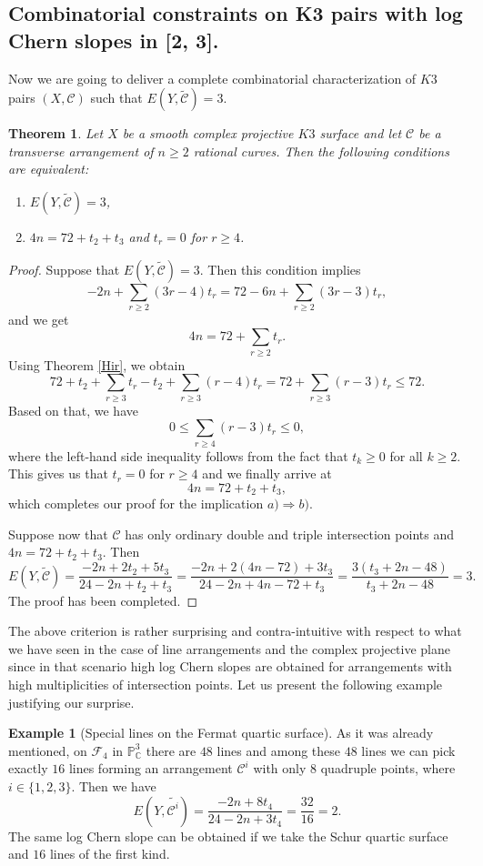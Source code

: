 \documentclass{article}
\theoremstyle{plain}
\newtheorem{theorem}[thm]{Theorem}
\theoremstyle{definition}
\newtheorem{example}[thm]{Example}
\numberwithin{equation}{section}
\begin{document}
\subsection{Combinatorial constraints on K3 pairs with log Chern slopes in [2, 3].}\label{sec:comb_constr_K3}
Now we are going to deliver a complete combinatorial characterization of $K3$ pairs $(X,\mathcal{C})$ such that $E(Y,\widetilde{\mathcal{C}}) = 3$.
\begin{theorem}
\label{bl}
Let $X$ be a smooth complex projective $K3$ surface and let $\mathcal{C}$ be a transverse arrangement of $n\geq 2$ rational curves. Then the following conditions are equivalent:
\begin{enumerate}
\item[a)] $E(Y,\widetilde{\mathcal{C}}) = 3$, 
\item[b)] $4n = 72 + t_{2}+t_{3}$ and $t_{r}=0$ for $r\geq 4$.
\end{enumerate}
\end{theorem}
\begin{proof}
Suppose that $E(Y,\widetilde{\mathcal{C}}) = 3$. Then this condition implies
\[-2n + \sum_{r\geq 2}(3r-4)t_{r} = 72 - 6n + \sum_{r\geq 2}(3r-3)t_{r},\]
and we get
\[4n = 72 + \sum_{r\geq 2}t_{r}.\]
Using Theorem \ref{Hir}, we obtain
\[72 + t_{2} + \sum_{r\geq 3} t_{r} - t_{2} + \sum_{r\geq 3}(r-4)t_{r} = 72 + \sum_{r\geq 3}(r-3)t_{r} \leq 72.\]
Based on that, we have 
\[0 \leq \sum_{r\geq 4}(r-3)t_{r} \leq 0,\]
where the left-hand side inequality follows from the fact that $t_{k}\geq 0$ for all $k\geq 2$. This gives us that $t_{r} = 0$ for $r\geq 4$ and we finally arrive at
\[4n = 72 +t_{2}+t_{3},\]
which completes our proof for the implication $a) \Rightarrow b)$.

Suppose now that $\mathcal{C}$ has only ordinary double and triple intersection points and $4n=72+t_{2}+t_{3}$. Then
\[E(Y,\widetilde{\mathcal{C}}) = \frac{-2n + 2t_{2}+5t_{3}}{24 -2n + t_{2}+t_{3}} = \frac{-2n + 2(4n-72)+3t_{3}}{24 -2n + 4n-72 + t_{3}} = \frac{3(t_{3}+2n-48)}{t_{3}+2n-48} = 3.\]
The proof has been completed.
\end{proof}
The above criterion is rather surprising and contra-intuitive with respect to what we have seen in the case of line arrangements and the complex projective plane since in that scenario high log Chern slopes are obtained for arrangements with high multiplicities of intersection points. Let us present the following example justifying our surprise.
\begin{example}[Special lines on the Fermat quartic surface]
As it was already mentioned, on $\mathcal{F}_{4}$ in $\mathbb{P}^{3}_{\mathbb{C}}$ there are $48$ lines and among these $48$ lines we can pick exactly $16$ lines forming an arrangement $\mathcal{C}^{i}$ with only $8$ quadruple points, where $i \in \{1,2,3\}$. Then we have
\[E(Y,\widetilde{\mathcal{C}^{i}}) = \frac{-2n+8t_{4}}{24 - 2n + 3t_{4}} = \frac{32}{16} = 2.\]
The same log Chern slope can be obtained if we take the Schur quartic surface and $16$ lines of the first kind.
\end{example}
\end{document}
